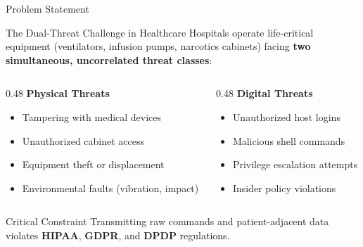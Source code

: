 \documentclass[10pt, aspectratio=169]{beamer}
\begin{document}
\begin{frame}{Problem Statement}
  \begin{block}{The Dual-Threat Challenge in Healthcare}
    Hospitals operate life-critical equipment (ventilators, infusion pumps, narcotics cabinets)
    facing \textbf{two simultaneous, uncorrelated threat classes}:
  \end{block}
  \vspace{6pt}
  \begin{columns}[T]
    \begin{column}{0.48\textwidth}
      \textbf{\textcolor{patentblue}{Physical Threats}}
      \begin{itemize}
        \item Tampering with medical devices
        \item Unauthorized cabinet access
        \item Equipment theft or displacement
        \item Environmental faults (vibration, impact)
      \end{itemize}
    \end{column}
    \begin{column}{0.48\textwidth}
      \textbf{\textcolor{patentblue}{Digital Threats}}
      \begin{itemize}
        \item Unauthorized host logins
        \item Malicious shell commands
        \item Privilege escalation attempts
        \item Insider policy violations
      \end{itemize}
    \end{column}
  \end{columns}
  \vspace{8pt}
  \begin{alertblock}{Critical Constraint}
    Transmitting raw commands and patient-adjacent data violates
    \textbf{HIPAA}, \textbf{GDPR}, and \textbf{DPDP} regulations.
  \end{alertblock}
\end{frame}
\end{document}
